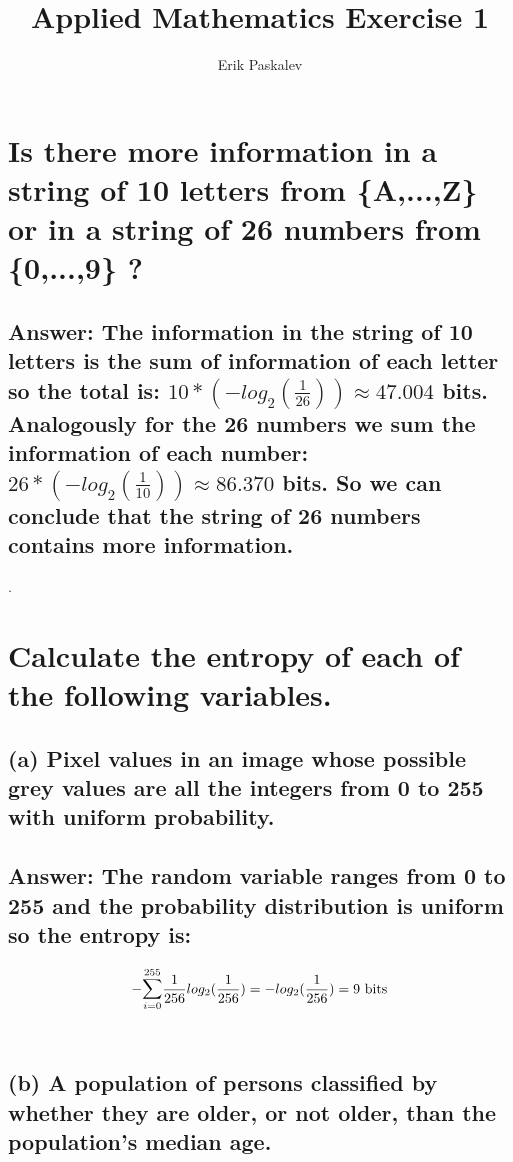 \documentclass[15px]{article}
\title{Applied Mathematics Exercise 1}
\author{Erik Paskalev}
\begin{document}
\maketitle

\section{\normalfont Is there more information in a string of 10 letters from \{A,...,Z\} or in a string of 26 numbers from \{0,...,9\} ? }

\subsection*{Answer: The information in the string of 10 letters is the sum of information of each letter so the total is: \(10*(-log_2(\frac{1}{26}))\approx 47.004 \)  bits.
Analogously for the 26 numbers we sum the information of each number: \(26*(-log_2(\frac{1}{10}))\approx 86.370 \) bits. So we can conclude that the string of 26 numbers contains more information.}.

\section{\normalfont Calculate the entropy of each of the following variables.}

\subsection*{\normalfont (a) Pixel values in an image whose possible grey values are all the integers from 0 to 255 with
uniform probability. }

\subsection*{Answer: The random variable ranges from 0 to 255 and the probability distribution is uniform so the entropy is: }
\begin{equation}
-\mathlarger{\sum}_{i=0}^{255} \frac{1}{256}log_2(\frac{1}{256}) = -log_2(\frac{1}{256}) = 9 \text{ bits}
\end{equation} \\
\subsection*{\normalfont (b) A population of persons classified by whether they are older, or not older, than the population's median age. }
\end{document}
